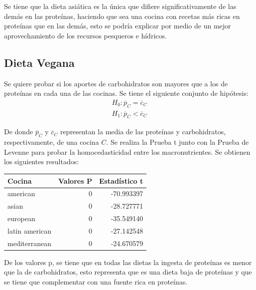 \documentclass[12pt,a4paper]{article}
\begin{document}
{{            Se tiene que la dieta asiática es la única que difiere significativamente 
            de las demás en las proteínas, haciendo que sea una cocina con recetas 
            más ricas en proteínas que en las demás, esto se podría explicar por 
            medio de un mejor aprovechamiento de los recursos pesqueros e hídricos.
        }

        \subsection{Dieta Vegana}
        {
            Se quiere probar si los aportes de carbohidratos son mayores 
            que a los de proteínas en cada una de las cocinas. Se tiene el 
            siguiente conjunto de hipótesis:
            \begin{align*}
                H_0 : \overline{p}_C = \overline{c}_C \\
                H_1 : \overline{p}_C < \overline{c}_C
            \end{align*}

            De donde $\overline{p}_C$ y $\overline{c}_C$ representan la media 
            de las proteínas y carbohidratos, respectivamente, de una cocina $C$. 
            Se realiza la Prueba t junto con la Prueba de Levenne para 
            probar la homocedasticidad entre los macronutrientes. Se obtienen 
            los siguientes resultados:

            \begin{center}
                \begin{tabular}{lrr}
                \toprule
                    Cocina & Valores P & Estadístico t \\
                \midrule
                    american       & 0 & -70.993397 \\
                    asian          & 0 & -28.727771 \\
                    european       & 0 & -35.549140 \\
                    latin american & 0 & -27.142548 \\
                    mediterranean  & 0 & -24.670579 \\
                \bottomrule
                \end{tabular}
            \end{center}

            De los valores p, se tiene que en todas las dietas la ingesta de 
            proteínas es menor que la de carbohidratos, esto representa que 
            es una dieta baja de proteínas y que se tiene que complementar 
            con una fuente rica en proteínas.
        }

}
\end{document}
